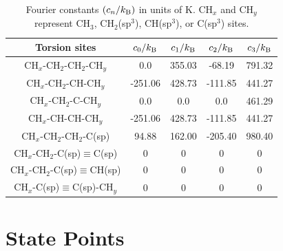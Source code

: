 \documentclass[journal=jctc,manuscript=article]{achemso}
\begin{document}
    \begin{table}[h!]
		\caption{Fourier constants $(c_n/k_{\rm B})$ in units of K. CH$_x$ and CH$_y$ represent CH$_3$, CH$_2$(sp$^3$), CH(sp$^3$), or C(sp$^3$) sites.} \label{tab:torsions}
		\begin{center}
			\begin{tabular}{|c|c|c|c|c|}
				\hline
				Torsion sites & $c_0/k_{\rm B}$ & $c_1/k_{\rm B}$ & $c_2/k_{\rm B}$ & $c_3/k_{\rm B}$ \\ \hline
				CH$_x$-CH$_2$-CH$_2$-CH$_y$ & 0.0 & 355.03 & -68.19 & 791.32 \\ 
				CH$_x$-CH$_2$-CH-CH$_y$ & -251.06 & 428.73 & -111.85 & 441.27 \\
				CH$_x$-CH$_2$-C-CH$_y$ & 0.0 & 0.0 & 0.0 & 461.29 \\
				CH$_x$-CH-CH-CH$_y$ & -251.06 & 428.73 & -111.85 & 441.27 \\
				CH$_x$-CH$_2$-CH$_2$-C(sp) & 94.88 & 162.00 & -205.40 & 980.40 \\
				CH$_x$-CH$_2$-C(sp)$\equiv$C(sp) & 0 & 0 & 0 & 0 \\
				CH$_x$-CH$_2$-C(sp)$\equiv$CH(sp) & 0 & 0 & 0 & 0 \\
				CH$_x$-C(sp)$\equiv$C(sp)-CH$_y$ & 0 & 0 & 0 & 0 \\
				\hline
			\end{tabular}
		\end{center} 
	\end{table}


\newpage
\clearpage

\section{State Points} \label{SI sec: State Points}
\end{document}
